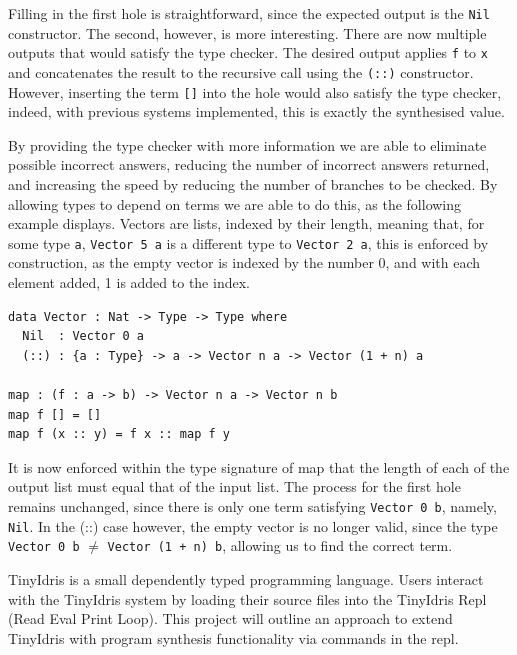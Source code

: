 \documentclass[a4paper]{article}
\begin{document}
Filling in the first hole is straightforward, since the expected output 
is the \texttt{Nil} constructor. The second, however, is more interesting.
There are now multiple outputs that would satisfy the type checker. 
The desired output applies \texttt{f} to \texttt{x} and concatenates the result to the
recursive call using the \texttt{(::)} constructor. However, inserting the term
\texttt{[]} into the hole would also satisfy the type checker, indeed,
with previous systems implemented, this is exactly the synthesised 
value.

By providing the type checker with more information we are able to 
eliminate possible incorrect answers, reducing the number of incorrect 
answers returned, and increasing the speed by reducing the number of 
branches to be checked. By allowing types to depend on terms we are 
able to do this, as the following example displays. Vectors are lists,
indexed by their length, meaning that, for some type \texttt{a},
\texttt{Vector 5 a} is a different type to \texttt{Vector 2 a}, this
is enforced by construction, as the empty vector is indexed by the
number 0, and with each element added, 1 is added to the index.  

\begin{center}
\begin{verbatim}
data Vector : Nat -> Type -> Type where
  Nil  : Vector 0 a
  (::) : {a : Type} -> a -> Vector n a -> Vector (1 + n) a

map : (f : a -> b) -> Vector n a -> Vector n b
map f [] = []
map f (x :: y) = f x :: map f y
\end{verbatim}
\end{center}

It is now enforced within the type signature of map that the length of
each of the output list must equal that of the input list. The process
for the first hole remains unchanged, since there is 
only one term satisfying \texttt{Vector 0 b}, namely, \texttt{Nil}.
In the (::) case however, the empty vector is no longer valid,
since the type \texttt{Vector 0 b} \(\neq\) \texttt{Vector (1 + n) b},
allowing us to find the correct term. 

TinyIdris is a small dependently typed programming language.
Users interact with the TinyIdris system by loading their source files
into the TinyIdris Repl (Read Eval Print Loop). This project
will outline an approach to extend TinyIdris with program synthesis
functionality via commands in the repl.

\clearpage
\end{document}
